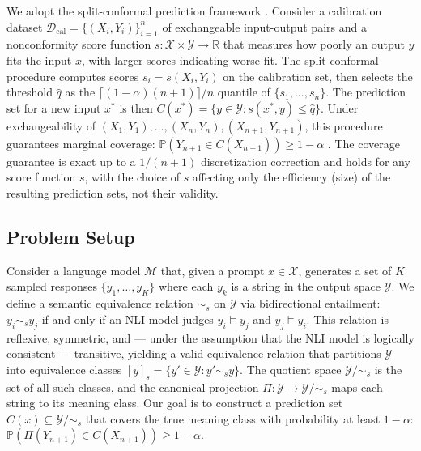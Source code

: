 \documentclass{article}
\begin{document}
\label{sec:conformal_prediction}

We adopt the split-conformal prediction framework \cite{angelopoulos2021gentle}. Consider a calibration dataset $\mathcal{D}_{\text{cal}} = \{(X_i, Y_i)\}_{i=1}^{n}$ of exchangeable input-output pairs and a nonconformity score function $s: \mathcal{X} \times \mathcal{Y} \rightarrow \mathbb{R}$ that measures how poorly an output $y$ fits the input $x$, with larger scores indicating worse fit. The split-conformal procedure computes scores $s_i = s(X_i, Y_i)$ on the calibration set, then selects the threshold $\hat{q}$ as the $\lceil(1-\alpha)(n+1)\rceil / n$ quantile of $\{s_1, \ldots, s_n\}$. The prediction set for a new input $x^*$ is then $C(x^*) = \{y \in \mathcal{Y} : s(x^*, y) \leq \hat{q}\}$. Under exchangeability of $(X_1, Y_1), \ldots, (X_n, Y_n), (X_{n+1}, Y_{n+1})$, this procedure guarantees marginal coverage: $\mathbb{P}(Y_{n+1} \in C(X_{n+1})) \geq 1 - \alpha$ \cite{angelopoulos2024theoretical}. The coverage guarantee is exact up to a $1/(n+1)$ discretization correction and holds for any score function $s$, with the choice of $s$ affecting only the efficiency (size) of the resulting prediction sets, not their validity.

\subsection{Problem Setup}

\label{sec:problem_setup}

Consider a language model $\mathcal{M}$ that, given a prompt $x \in \mathcal{X}$, generates a set of $K$ sampled responses $\{y_1, \ldots, y_K\}$ where each $y_k$ is a string in the output space $\mathcal{Y}$. We define a semantic equivalence relation $\sim_s$ on $\mathcal{Y}$ via bidirectional entailment: $y_i \sim_s y_j$ if and only if an NLI model judges $y_i \models y_j$ and $y_j \models y_i$. This relation is reflexive, symmetric, and --- under the assumption that the NLI model is logically consistent --- transitive, yielding a valid equivalence relation that partitions $\mathcal{Y}$ into equivalence classes $[y]_s = \{y' \in \mathcal{Y} : y' \sim_s y\}$. The quotient space $\mathcal{Y}/{\sim_s}$ is the set of all such classes, and the canonical projection $\Pi: \mathcal{Y} \rightarrow \mathcal{Y}/{\sim_s}$ maps each string to its meaning class. Our goal is to construct a prediction set $C(x) \subseteq \mathcal{Y}/{\sim_s}$ that covers the true meaning class with probability at least $1 - \alpha$: $\mathbb{P}(\Pi(Y_{n+1}) \in C(X_{n+1})) \geq 1 - \alpha$.
\end{document}

